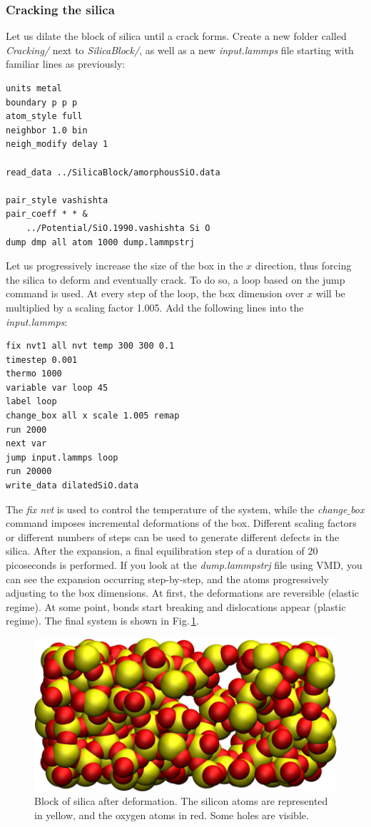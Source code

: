 \documentclass[9pt,tutorial]{livecoms}
\begin{document}
\subsubsection{Cracking the silica}
Let us dilate the block of silica until a crack forms. Create a new folder called \textit{Cracking/} next to \textit{SilicaBlock/}, as well as a new \textit{input.lammps} file starting with familiar lines as previously:
{\normalsize \begin{verbatim}
units metal
boundary p p p
atom_style full
neighbor 1.0 bin
neigh_modify delay 1

read_data ../SilicaBlock/amorphousSiO.data

pair_style vashishta
pair_coeff * * &
    ../Potential/SiO.1990.vashishta Si O
dump dmp all atom 1000 dump.lammpstrj
\end{verbatim}}
Let us progressively increase the size of the box in the $x$ direction, thus forcing the silica to deform and eventually crack. To do so, a loop based on the jump command is used. At every step of the loop, the box dimension over $x$ will be multiplied by a scaling factor 1.005. Add the following lines into the \textit{input.lammps}:
{\normalsize \begin{verbatim}
fix nvt1 all nvt temp 300 300 0.1
timestep 0.001
thermo 1000
variable var loop 45
label loop
change_box all x scale 1.005 remap
run 2000
next var
jump input.lammps loop
run 20000
write_data dilatedSiO.data
\end{verbatim}}
\noindent The \textit{fix nvt} is used to control the temperature of the system, while the \textit{change$\_$box} command
imposes incremental deformations of the box. Different scaling factors or different numbers of steps can be used to generate different defects in the silica. After the expansion, a final equilibration step of a duration of 20 picoseconds is performed. If you look at the \textit{dump.lammpstrj} file using VMD, you can see the expansion occurring step-by-step, and the atoms progressively adjusting to the box dimensions. At first, the deformations are reversible (elastic regime). At some point, bonds start breaking and dislocations appear (plastic regime). The final system is shown in Fig.\,\ref{fig:GCMC-cracked}. 

\begin{figure}
\centering
\includegraphics[width=\linewidth]{GCMC-cracked}
\caption{Block of silica after deformation. The silicon atoms are represented in yellow, and the oxygen atoms in red. Some holes are visible.}
\label{fig:GCMC-cracked}
\end{figure}
\end{document}
